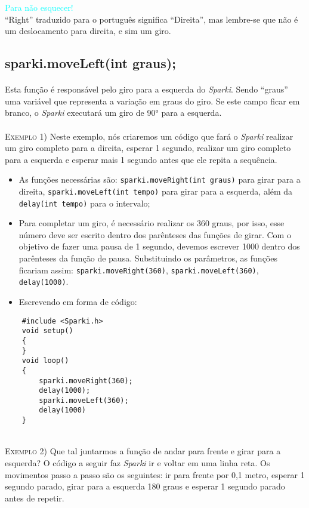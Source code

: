     \begin{center}
    \textcolor{cyan}{Para não esquecer!}
    \\``Right'' traduzido para o português significa ``Direita'', mas lembre-se que não é um deslocamento para direita, e sim um giro.
    \end{center}
    
\subsection{sparki.moveLeft(int graus);}
    \paragraph{}
    Esta função é responsável pelo giro para a esquerda do \textsl{Sparki}. Sendo ``graus'' uma variável que representa a variação em graus do giro. Se este campo ficar em branco, o \textsl{Sparki} executará um giro de 90° para a esquerda.
    \\~\\
    \textsc{Exemplo 1)} Neste exemplo, nós criaremos um código que fará o \textsl{Sparki} realizar um giro completo para a direita, esperar 1 segundo, realizar um giro completo para a esquerda e esperar mais 1 segundo antes que ele repita a sequência.
    
    \begin{itemize}
        \item As funções necessárias são: \texttt{sparki.moveRight(int graus)} para girar para a direita, \texttt{sparki.moveLeft(int tempo)} para girar para a esquerda, além da \texttt{delay(int tempo)} para o intervalo;
        \item Para completar um giro, é necessário realizar os 360 graus, por isso, esse número deve ser escrito dentro dos parênteses das funções de girar. Com o objetivo de fazer uma pausa de 1 segundo, devemos escrever 1000 dentro dos parênteses da função de pausa. Substituindo os parâmetros, as funções ficariam assim: \texttt{sparki.moveRight(360)}, \texttt{sparki.moveLeft(360)}, \texttt{delay(1000)}.
        \item Escrevendo em forma de código:
    \end{itemize}
    
    \begin{verbatim}
    #include <Sparki.h>
    void setup()
    {
    }
    void loop()
    {
        sparki.moveRight(360);
        delay(1000);
        sparki.moveLeft(360);
        delay(1000)
    }
    \end{verbatim}
    \\
    \textsc{Exemplo 2)} Que tal juntarmos a função de andar para frente e girar para a esquerda? O código a seguir faz \textsl{Sparki} ir e voltar em uma linha reta. Os movimentos passo a passo são os seguintes: ir para frente por 0,1 metro, esperar 1 segundo parado, girar para a esquerda 180 graus e esperar 1 segundo parado antes de repetir.

